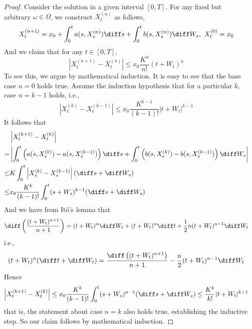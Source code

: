 \newcommand{\arcsinh}{\mathrm{arcsinh}}

    \problem
    \begin{proof}
        Consider the solution in a given interval $[0,T]$.
        For any fixed but arbitrary $\omega\in\Omega$,
        we construct $X_t^{(n)}$ as follows,
        \begin{equation}
            \label{eq:induction formula}
            X_t^{(n+1)}=x_0+\int_0^ta(s,X_s^{(n)})\diff s
            +\int_0^tb(s,X_s^{(n)})\diff W_s,
            \ X_t^{(0)}=x_0
        \end{equation}
        And we claim that for any $t\in[0,T]$,
        \[\left|X_t^{(n+1)}-X_t^{(n)}\right|
        \leq x_0\frac{K^n}{n!}(t+W_t)^{n}\]
        To see this,
        we argue by mathematical induction.
        It is easy to see that the base case $n=0$ holds true.
        Assume the induction hypothesis that for a particular
        $k$, case $n=k-1$ holds, i.e.,
        \[\left|X_t^{(k)}-X_t^{(k-1)}\right|
        \leq x_0\frac{K^{k-1}}{(k-1)!}|t+W_t|^{k-1}\]
        It follows that
        \[\begin{aligned}
            &\left|X_t^{(k+1)}-X_t^{(k)}\right|\\
            =&\left|\int_0^t\left(a(s,X_s^{(k)})-a(s,X_s^{(k-1)})\right)\diff s
            +\int_0^t\left(b(s,X_s^{(k)})-b(s,X_s^{(k-1)})\right)\diff W_s\right|\\
            \leq&K\int_0^t\left|X_s^{(k)}-X_s^{(k-1)}\right|(\diff s+\diff W_s)\\
            \leq&x_0\frac{K^k}{(k-1)!}\int_0^t(s+W_s)^{k-1}(\diff s+\diff W_s)
        \end{aligned}\]
        And we have from It\^o's lemma that
        \[\diff\left(\frac{(t+W_t)^{n+1}}{n+1}\right)
        =(t+W_t)^n\diff W_t+(t+W_t)^n\diff t+\frac{1}{2}n(t+W_t)^{n-1}\diff W_t\]
        i.e.,
        \[(t+W_t)^n(\diff t+\diff W_t)
        =\frac{\diff\left((t+W_t)^{n+1}\right)}{n+1}
        -\frac{n}{2}(t+W_t)^{n-1}\diff W_t\]
        Hence
        \[\left|X_t^{(k+1)}-X_t^{(k)}\right|\leq
        x_0\frac{K^k}{(k-1)!}\int_0^t(s+W_s)^{n-1}(\diff s+\diff W_s)
        \leq\frac{K^k}{k!}|t+W_t|^{k+1}\]
        that is, the statement about case $n=k$ also holds true,
        establishing the inductive step. So our claim follows by
        mathematical induction.


\end{proof}
